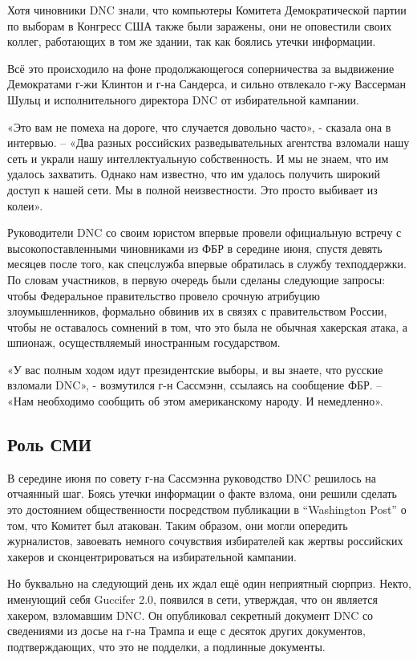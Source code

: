 Хотя чиновники DNC знали, что компьютеры Комитета Демократической партии
по выборам в Конгресс США также были заражены, они не оповестили своих
коллег, работающих в том же здании, так как боялись утечки информации.

Всё это происходило на фоне продолжающегося соперничества за выдвижение
Демократами г-жи Клинтон и г-на Сандерса, и сильно отвлекало г-жу
Вассерман Шульц и исполнительного директора DNC от избирательной
кампании.

«Это вам не помеха на дороге, что случается довольно часто», - сказала
она в интервью. -- «Два разных российских разведывательных агентства
взломали нашу сеть и украли нашу интеллектуальную собственность. И мы не
знаем, что им удалось захватить. Однако нам известно, что им удалось
получить широкий доступ к нашей сети. Мы в полной неизвестности. Это
просто выбивает из колеи».

Руководители DNC со своим юристом впервые провели официальную встречу с
высокопоставленными чиновниками из ФБР в середине июня, спустя девять
месяцев после того, как спецслужба впервые обратилась в службу
техподдержки. По словам участников, в первую очередь были сделаны
следующие запросы: чтобы Федеральное правительство провело срочную
атрибуцию злоумышленников, формально обвинив их в связях с
правительством России, чтобы не оставалось сомнений в том, что это была
не обычная хакерская атака, а шпионаж, осуществляемый иностранным
государством.

«У вас полным ходом идут президентские выборы, и вы знаете, что русские
взломали DNC», - возмутился г-н Сассмэнн, ссылаясь на сообщение ФБР. --
«Нам необходимо сообщить об этом американскому народу. И немедленно».

\hypertarget{ux440ux43eux43bux44c-ux441ux43cux438}{%
\subsection{\texorpdfstring{\textbf{Роль
СМИ}}{Роль СМИ}}\label{ux440ux43eux43bux44c-ux441ux43cux438}}

В середине июня по совету г-на Сассмэнна руководство DNC решилось на
отчаянный шаг. Боясь утечки информации о факте взлома, они решили
сделать это достоянием общественности посредством публикации в
``Washington Post'' о том, что Комитет был атакован. Таким образом, они
могли опередить журналистов, завоевать немного сочувствия избирателей
как жертвы российских хакеров и сконцентрироваться на избирательной
кампании.

Но буквально на следующий день их ждал ещё один неприятный сюрприз.
Некто, именующий себя Guccifer 2.0, появился в сети, утверждая, что он
является хакером, взломавшим DNC. Он опубликовал секретный документ DNC
со сведениями из досье на г-на Трампа и еще с десяток других документов,
подтверждающих, что это не подделки, а подлинные документы.

